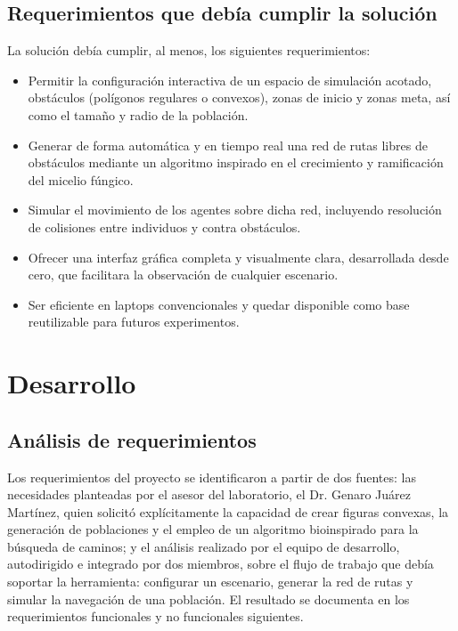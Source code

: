 \documentclass[12pt,a4paper]{article}
\begin{document}
\subsection*{Requerimientos que debía cumplir la solución}
La solución debía cumplir, al menos, los siguientes requerimientos:
\begin{itemize}
    \item Permitir la configuración interactiva de un espacio de simulación acotado, obstáculos (polígonos regulares o convexos), zonas de inicio y zonas meta, así como el tamaño y radio de la población.
    \item Generar de forma automática y en tiempo real una red de rutas libres de obstáculos mediante un algoritmo inspirado en el crecimiento y ramificación del micelio fúngico.
    \item Simular el movimiento de los agentes sobre dicha red, incluyendo resolución de colisiones entre individuos y contra obstáculos.
    \item Ofrecer una interfaz gráfica completa y visualmente clara, desarrollada desde cero, que facilitara la observación de cualquier escenario.
    \item Ser eficiente en laptops convencionales y quedar disponible como base reutilizable para futuros experimentos.
\end{itemize}


\section{Desarrollo}

\subsection{Análisis de requerimientos}

Los requerimientos del proyecto se identificaron a partir de dos fuentes: las necesidades planteadas por el asesor del laboratorio, el Dr. Genaro Juárez Martínez, quien solicitó explícitamente la capacidad de crear figuras convexas, la generación de poblaciones y el empleo de un algoritmo bioinspirado para la búsqueda de caminos; y el análisis realizado por el equipo de desarrollo, autodirigido e integrado por dos miembros, sobre el flujo de trabajo que debía soportar la herramienta: configurar un escenario, generar la red de rutas y simular la navegación de una población. El resultado se documenta en los requerimientos funcionales y no funcionales siguientes.
\end{document}
